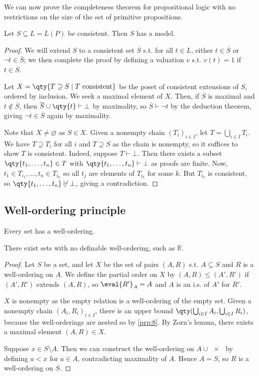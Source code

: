 We can now prove the completeness theorem for propositional logic with no restrictions on the size of the set of primitive propositions.
\begin{theorem}
    Let $S \subseteq L = L(P)$ be consistent.
    Then $S$ has a model.
\end{theorem}
\begin{proof}
    We will extend $S$ to a consistent set $\overline S$ s.t. for all $t \in L$, either $t \in \overline S$ or $\neg t \in \overline S$; we then complete the proof by defining a valuation $v$ s.t. $v(t) = 1$ if $t \in \overline S$.

    Let $X = \qty{T \supseteq S \mid T \text{ consistent}}$ be the poset of consistent extensions of $S$, ordered by inclusion.
    We seek a maximal element of $X$.
    Then, if $\overline S$ is maximal and $t \not\in \overline S$, then $\overline S \cup \qty{t} \vdash \bot$ by maximality, so $\overline S \vdash \neg t$ by the deduction theorem, giving $\neg t \in \overline S$ again by maximality.

    Note that $X \neq \varnothing$ as $S \in X$.
    Given a nonempty chain $(T_i)_{i \in I}$, let $T = \bigcup_{i \in I} T_i$.
    We have $T \supseteq T_i$ for all $i$ and $T \supseteq S$ as the chain is nonempty, so it suffices to show $T$ is consistent.
    Indeed, suppose $T \vdash \bot$.
    Then there exists a subset $\qty{t_1, \dots, t_n} \in T$ with $\qty{t_1, \dots, t_n} \vdash \bot$ as proofs are finite.
    Now, $t_1 \in T_{i_1}, \dots, t_n \in T_{i_n}$ so all $t_j$ are elements of $T_{i_k}$ for some $k$.
    But $T_{i_k}$ is consistent, so $\qty{t_1, \dots, t_n} \not\vdash \bot$, giving a contradiction.
\end{proof}

\subsection{Well-ordering principle}
\begin{theorem}
    Every set has a well-ordering.
\end{theorem}
There exist sets with no definable well-ordering, such as $\mathbb R$.
\begin{proof}
    Let $S$ be a set, and let $X$ be the set of pairs $(A, R)$ s.t. $A \subseteq S$ and $R$ is a well-ordering on $A$.
    We define the partial order on $X$ by $(A, R) \leq (A', R')$ if $(A', R')$ extends $(A, R)$, so $\eval{R'}_A = A$ and $A$ is an i.s. of $A'$ for $R'$.

    $X$ is nonempty as the empty relation is a well-ordering of the empty set.
    Given a nonempty chain $(A_i, R_i)_{i \in I}$, there is an upper bound $\qty(\bigcup_{i \in I} A_i, \bigcup_{i \in I} R_i)$, because the well-orderings are nested so by \cref{prp:8}.
    By Zorn's lemma, there exists a maximal element $(A, R) \in X$.

    Suppose $x \in S \setminus A$.
    Then we can construct the well-ordering on $A \cup \qty{x}$ by defining $a < x$ for $a \in A$, contradicting maximality of $A$.
    Hence $A = S$, so $R$ is a well-ordering on $S$.
\end{proof}

